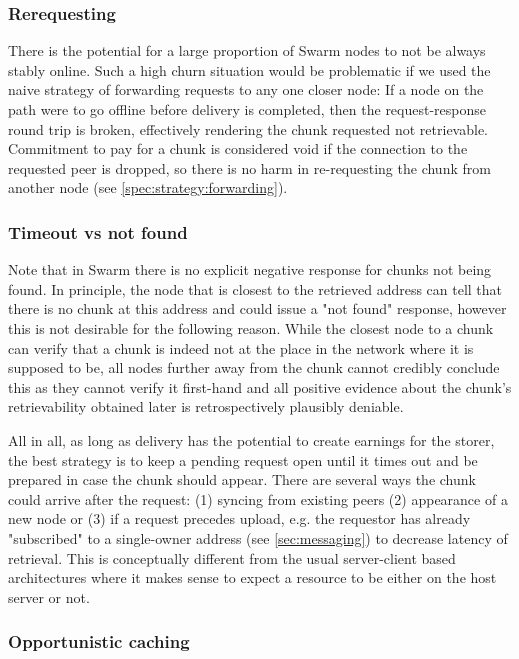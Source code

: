 \subsubsection{Rerequesting}

There is the potential for a large proportion of Swarm nodes to not be always stably online. Such a high churn situation would be problematic if we used the naive strategy of forwarding requests to any one closer node: If a node on the path were to go offline before delivery is completed, then the request-response round trip is broken, effectively rendering the chunk requested not retrievable. Commitment to pay for a chunk is considered void if the connection to the requested peer is dropped, so there is no harm in re-requesting the chunk from another node (see \ref{spec:strategy:forwarding}).


\subsubsection{Timeout vs not found}

Note that in Swarm there is no explicit negative response for chunks not being found. In principle, the node that is closest to the retrieved address can tell that there is no chunk at this address and could issue a "not found" response, however this is not desirable for the following reason. While the closest node to a chunk can verify that a chunk is indeed not at the place in the network where it is supposed to be, all nodes further away from the chunk cannot credibly conclude this as they cannot verify it first-hand and all positive evidence about the chunk's retrievability obtained later is retrospectively plausibly deniable. 

All in all, as long as delivery has the potential to create earnings for the storer, the best strategy is to keep a pending request open until it times out and be prepared in case the chunk should appear. There are several ways the chunk could arrive after the request: (1) syncing from existing peers (2) appearance of a new node or (3) if a request precedes upload, e.g. the requestor has already "subscribed" to a single-owner address (see \ref{sec:messaging}) to decrease latency of retrieval. This is conceptually different from the usual server-client based architectures where it makes sense to expect a resource to be either on the host server or not. 
 

\subsubsection{Opportunistic caching}

